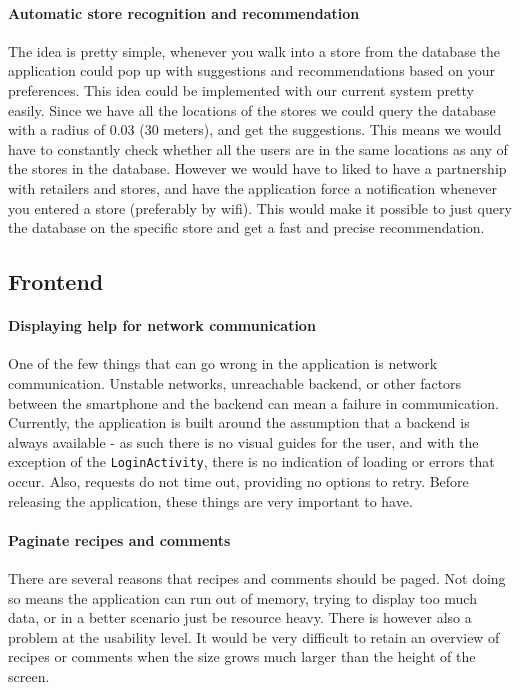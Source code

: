 \paragraph{Automatic store recognition and recommendation}
The idea is pretty simple, whenever you walk into a store from the database the application could pop up with suggestions and recommendations based on your preferences. This idea could be implemented with our current system pretty easily. Since we have all the locations of the stores we could query the database with a radius of 0.03 (30 meters), and get the suggestions. This means we would have to constantly check whether all the users are in the same locations as any of the stores in the database. However we would have to liked to have a partnership with retailers and stores, and have the application force a notification whenever you entered a store (preferably by wifi). This would make it possible to just query the database on the specific store and get a fast and precise recommendation.

\subsection{Frontend}

\paragraph{Displaying help for network communication}
One of the few things that can go wrong in the application is network communication. Unstable networks, unreachable backend, or other factors between the smartphone and the backend can mean a failure in communication. Currently, the application is built around the assumption that a backend is always available - as such there is no visual guides for the user, and with the exception of the \texttt{LoginActivity}, there is no indication of loading or errors that occur. Also, requests do not time out, providing no options to retry. Before releasing the application, these things are very important to have.

\paragraph{Paginate recipes and comments}
There are several reasons that recipes and comments should be paged. Not doing so means the application can run out of memory, trying to display too much data, or in a better scenario just be resource heavy. There is however also a problem at the usability level. It would be very difficult to retain an overview of recipes or comments when the size grows much larger than the height of the screen. 

